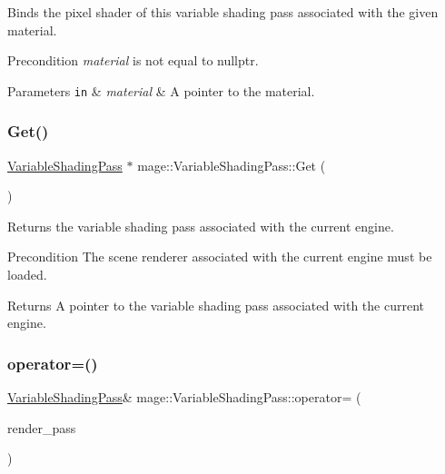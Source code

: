 Binds the pixel shader of this variable shading pass associated with the given material.

\begin{DoxyPrecond}{Precondition}
{\itshape material} is not equal to {\ttfamily nullptr}. 
\end{DoxyPrecond}

\begin{DoxyParams}[1]{Parameters}
\mbox{\tt in}  & {\em material} & A pointer to the material. \\
\hline
\end{DoxyParams}
\hypertarget{classmage_1_1_variable_shading_pass_a4c5572071474485e60af17b34539a603}{}\label{classmage_1_1_variable_shading_pass_a4c5572071474485e60af17b34539a603} 
\subsubsection{\texorpdfstring{Get()}{Get()}}
{\footnotesize\ttfamily \hyperlink{classmage_1_1_variable_shading_pass}{Variable\+Shading\+Pass} $\ast$ mage\+::\+Variable\+Shading\+Pass\+::\+Get (\begin{DoxyParamCaption}{ }\end{DoxyParamCaption})\hspace{0.3cm}{\ttfamily [static]}}

Returns the variable shading pass associated with the current engine.

\begin{DoxyPrecond}{Precondition}
The scene renderer associated with the current engine must be loaded. 
\end{DoxyPrecond}
\begin{DoxyReturn}{Returns}
A pointer to the variable shading pass associated with the current engine. 
\end{DoxyReturn}
\hypertarget{classmage_1_1_variable_shading_pass_ad846c4f7ffc5b795ba1c0fa03bd6c2af}{}\label{classmage_1_1_variable_shading_pass_ad846c4f7ffc5b795ba1c0fa03bd6c2af} 
\subsubsection{\texorpdfstring{operator=()}{operator=()}\hspace{0.1cm}{\footnotesize\ttfamily [1/2]}}
{\footnotesize\ttfamily \hyperlink{classmage_1_1_variable_shading_pass}{Variable\+Shading\+Pass}\& mage\+::\+Variable\+Shading\+Pass\+::operator= (\begin{DoxyParamCaption}\item[{const \hyperlink{classmage_1_1_variable_shading_pass}{Variable\+Shading\+Pass} \&}]{render\+\_\+pass }\end{DoxyParamCaption})\hspace{0.3cm}{\ttfamily [delete]}}

